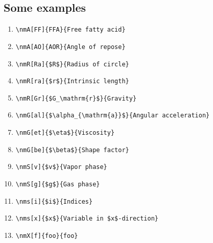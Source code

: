 \subsection{Some examples}
\begin{enumerate}
\item \verb|\nmA[FF]{FFA}{Free fatty acid}|
\item \verb|\nmA[AO]{AOR}{Angle of repose}|
\item \verb|\nmR[Ra]{$R$}{Radius of circle}|
\item \verb|\nmR[ra]{$r$}{Intrinsic length}|
\item \verb|\nmR[Gr]{$G_\mathrm{r}$}{Gravity}|
\item \verb|\nmG[al]{$\alpha_{\mathrm{a}}$}{Angular acceleration}|
\item \verb|\nmG[et]{$\eta$}{Viscosity}|
\item \verb|\nmG[be]{$\beta$}{Shape factor}|
\item \verb|\nmS[v]{$v$}{Vapor phase}|
\item \verb|\nmS[g]{$g$}{Gas phase}|
\item \verb|\nms[i]{$i$}{Indices}|
\item \verb|\nms[x]{$x$}{Variable in $x$-direction}|
\item \verb|\nmX[f]{foo}{foo}|
\end{enumerate} 















